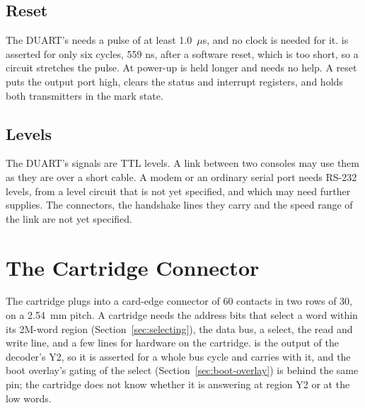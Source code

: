 \subsection{Reset}

The DUART's  needs a pulse of at least 1.0~$\mu$s, and no clock is needed for it.  is
asserted for only six cycles, 559 ns, after a software reset, which is too short, so a circuit stretches the pulse. At
power-up  is held longer and needs no help. A reset puts the output port high, clears the status and
interrupt registers, and holds both transmitters in the mark state.

\subsection{Levels}

The DUART's signals are TTL levels. A link between two consoles may use them as they are over a short cable. A modem or
an ordinary serial port needs RS-232 levels, from a level circuit that is not yet specified, and which may need further
supplies. The connectors, the handshake lines they carry and the speed range of the link are not yet specified.

\section{The Cartridge Connector}
\label{sec:cartridge-connector}

The cartridge plugs into a card-edge connector of 60 contacts in two rows of 30, on a 2.54~mm pitch. A cartridge needs
the address bits that select a word within its 2M-word region (Section~\ref{sec:selecting}), the data bus, a select,
the read and write line, and a few lines for hardware on the cartridge.  is the output of the decoder's
Y2, so it is asserted for a whole bus cycle and carries  with it, and the boot overlay's gating of the
select (Section~\ref{sec:boot-overlay}) is behind the same pin; the cartridge does not know whether it is answering at
region Y2 or at the low words.

